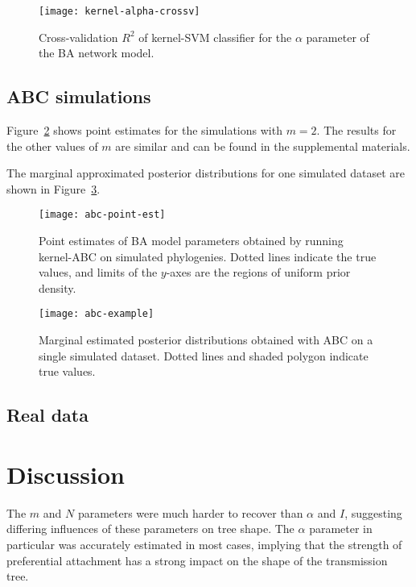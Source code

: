 \documentclass[12pt]{article}\usepackage[]{graphicx}\usepackage[]{color}
\begin{document}
\begin{figure}
  \texttt{[image: kernel-alpha-crossv]}
  \caption{Cross-validation $R^2$ of kernel-SVM classifier for the $\alpha$
    parameter of the \gls{BA} network model.}
  \label{fig:crossv}
\end{figure}

\subsection*{ABC simulations}

Figure~\ref{fig:abcpt} shows point estimates for the simulations with $m = 2$.
The results for the other values of $m$ are similar and can be found in the
supplemental materials.

The marginal approximated posterior distributions for one simulated dataset are
shown in Figure~\ref{fig:abcex}.

\begin{figure}
    \texttt{[image: abc-point-est]}
    \caption{Point estimates of \gls{BA} model parameters obtained by running
    kernel-ABC on simulated phylogenies. Dotted lines indicate the true values,
    and limits of the $y$-axes are the regions of uniform prior density.}
    \label{fig:abcpt}
\end{figure}

\begin{figure}
    \texttt{[image: abc-example]}
    \caption{Marginal estimated posterior distributions obtained with ABC on a
    single simulated dataset. Dotted lines and shaded polygon indicate true
    values.}
    \label{fig:abcex}
\end{figure}

\subsection*{Real data}

\section*{Discussion}


The $m$ and $N$ parameters were much harder to recover than $\alpha$ and $I$,
suggesting differing influences of these parameters on tree shape. The $\alpha$
parameter in particular was accurately estimated in most cases, implying that
the strength of preferential attachment has a strong impact on the shape of the
transmission tree.
\end{document}
